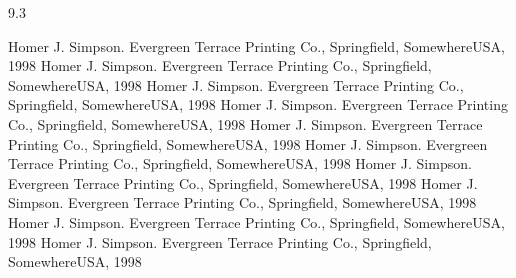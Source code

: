 \documentclass[a0]{a0poster}
\begin{document}
\framethin
\begin{area4}{9.3}
\vspace*{-70pt}
\small
\begin{thebibliography}{50}
 Homer J. Simpson. Evergreen Terrace Printing Co., Springfield, SomewhereUSA, 1998
 Homer J. Simpson. Evergreen Terrace Printing Co., Springfield, SomewhereUSA, 1998
 Homer J. Simpson. Evergreen Terrace Printing Co., Springfield, SomewhereUSA, 1998
 Homer J. Simpson. Evergreen Terrace Printing Co., Springfield, SomewhereUSA, 1998
 Homer J. Simpson. Evergreen Terrace Printing Co., Springfield, SomewhereUSA, 1998
 Homer J. Simpson. Evergreen Terrace Printing Co., Springfield, SomewhereUSA, 1998
 Homer J. Simpson. Evergreen Terrace Printing Co., Springfield, SomewhereUSA, 1998
 Homer J. Simpson. Evergreen Terrace Printing Co., Springfield, SomewhereUSA, 1998
 Homer J. Simpson. Evergreen Terrace Printing Co., Springfield, SomewhereUSA, 1998
 Homer J. Simpson. Evergreen Terrace Printing Co., Springfield, SomewhereUSA, 1998
\end{thebibliography}
\end{area4}

%
\end{document}
